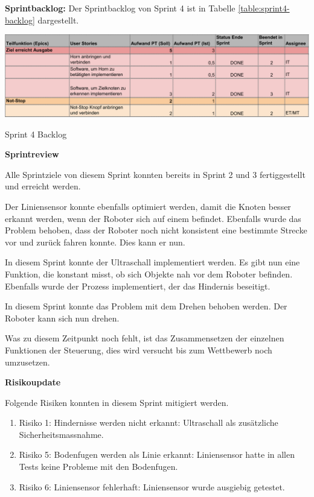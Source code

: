 \textbf{Sprintbacklog:} Der Sprintbacklog von Sprint 4 ist in Tabelle 
\ref{table:sprint4-backlog} 
dargestellt.


\begin{table}[H]
\centering
\includegraphics[width=\textwidth]{assets/projektmanagement/sprint4-crop.pdf}
\caption{Sprint 4 Backlog}
\label{table:sprint4-backlog}
\end{table}


\textbf{Sprintreview}

Alle Sprintziele von diesem Sprint konnten bereits in Sprint 2 und 3 fertiggestellt und erreicht werden.

Der Liniensensor konnte ebenfalls optimiert werden, damit die Knoten besser erkannt werden, wenn der Roboter sich auf einem befindet. Ebenfalls wurde das Problem behoben, dass der Roboter noch nicht konsistent eine bestimmte Strecke vor und zurück fahren konnte. Dies kann er nun.

In diesem Sprint konnte der Ultraschall implementiert werden. Es gibt nun eine Funktion, die konstant misst, ob sich Objekte nah vor dem Roboter befinden. Ebenfalls wurde der Prozess implementiert, der das Hindernis beseitigt.

In diesem Sprint konnte  das Problem mit dem Drehen behoben werden. Der Roboter kann sich nun drehen.

Was zu diesem Zeitpunkt noch fehlt, ist das Zusammensetzen der einzelnen Funktionen der Steuerung, dies wird versucht bis zum Wettbewerb noch umzusetzen.

\textbf{Risikoupdate}

Folgende Risiken konnten in diesem Sprint mitigiert werden.

\begin{enumerate}
    \item Risiko 1: Hindernisse werden nicht erkannt: Ultraschall als zusätzliche Sicherheitsmassnahme.
    \item Risiko 5: Bodenfugen werden als Linie erkannt: Liniensensor hatte in allen Tests keine Probleme mit den Bodenfugen.
    \item Risiko 6: Liniensensor fehlerhaft: Liniensensor wurde ausgiebig getestet.
\end{enumerate}

